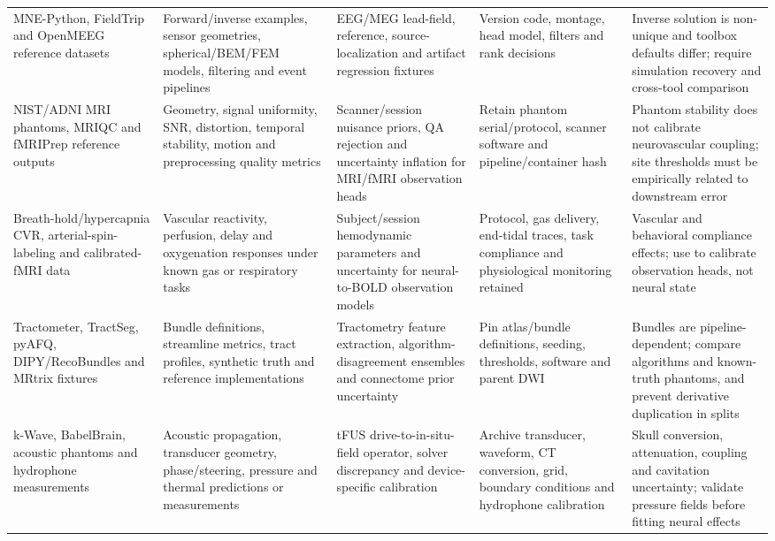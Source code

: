 \begin{table}[!h]
\begin{tabularx}{\textwidth}{@{}p{}p{}p{}p{}X@{}}
MNE-Python, FieldTrip and OpenMEEG reference datasets &
Forward/inverse examples, sensor geometries, spherical/BEM/FEM models,
filtering and event pipelines &
EEG/MEG lead-field, reference, source-localization and artifact regression
fixtures &
Version code, montage, head model, filters and rank decisions &
Inverse solution is non-unique and toolbox defaults differ; require
simulation recovery and cross-tool comparison\\

NIST/ADNI MRI phantoms, MRIQC and fMRIPrep reference outputs &
Geometry, signal uniformity, SNR, distortion, temporal stability, motion and
preprocessing quality metrics &
Scanner/session nuisance priors, QA rejection and uncertainty inflation for
MRI/fMRI observation heads &
Retain phantom serial/protocol, scanner software and pipeline/container hash &
Phantom stability does not calibrate neurovascular coupling; site thresholds
must be empirically related to downstream error\\

Breath-hold/hypercapnia CVR, arterial-spin-labeling and calibrated-fMRI data &
Vascular reactivity, perfusion, delay and oxygenation responses under known
gas or respiratory tasks &
Subject/session hemodynamic parameters and uncertainty for neural-to-BOLD
observation models &
Protocol, gas delivery, end-tidal traces, task compliance and physiological
monitoring retained &
Vascular and behavioral compliance effects; use to calibrate observation
heads, not neural state\\

Tractometer, TractSeg, pyAFQ, DIPY/RecoBundles and MRtrix fixtures &
Bundle definitions, streamline metrics, tract profiles, synthetic truth and
reference implementations &
Tractometry feature extraction, algorithm-disagreement ensembles and
connectome prior uncertainty &
Pin atlas/bundle definitions, seeding, thresholds, software and parent DWI &
Bundles are pipeline-dependent; compare algorithms and known-truth phantoms,
and prevent derivative duplication in splits\\

k-Wave, BabelBrain, acoustic phantoms and hydrophone measurements &
Acoustic propagation, transducer geometry, phase/steering, pressure and
thermal predictions or measurements &
tFUS drive-to-in-situ-field operator, solver discrepancy and device-specific
calibration &
Archive transducer, waveform, CT conversion, grid, boundary conditions and
hydrophone calibration &
Skull conversion, attenuation, coupling and cavitation uncertainty; validate
pressure fields before fitting neural effects\\


\end{tabularx}
\end{table}
